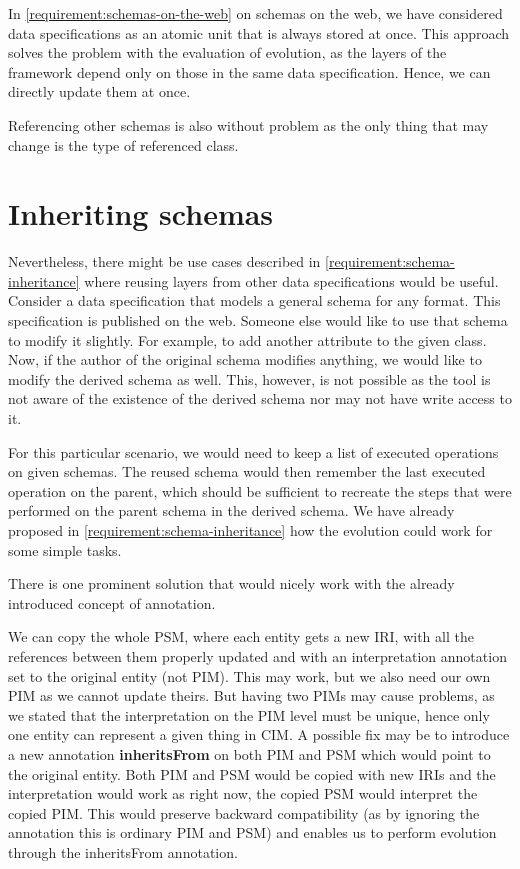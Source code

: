 \medskip

In \autoref{requirement:schemas-on-the-web} on schemas on the web, we have considered data specifications as an atomic unit that is always stored at once. This approach solves the problem with the evaluation of evolution, as the layers of the framework depend only on those in the same data specification. Hence, we can directly update them at once.

Referencing other schemas is also without problem as the only thing that may change is the type of referenced class.

\section{Inheriting schemas}\label{section:inheriting-schemas}

Nevertheless, there might be use cases described in \autoref{requirement:schema-inheritance} where reusing layers from other data specifications would be useful. Consider a data specification that models a general schema for any format. This specification is published on the web. Someone else would like to use that schema to modify it slightly. For example, to add another attribute to the given class. Now, if the author of the original schema modifies anything, we would like to modify the derived schema as well. This, however, is not possible as the tool is not aware of the existence of the derived schema nor may not have write access to it.

For this particular scenario, we would need to keep a list of executed operations on given schemas. The reused schema would then remember the last executed operation on the parent, which should be sufficient to recreate the steps that were performed on the parent schema in the derived schema. We have already proposed in \autoref{requirement:schema-inheritance} how the evolution could work for some simple tasks.

There is one prominent solution that would nicely work with the already introduced concept of annotation.

We can copy the whole PSM, where each entity gets a new IRI, with all the references between them properly updated and with an interpretation annotation set to the original entity (not PIM). This may work, but we also need our own PIM as we cannot update theirs. But having two PIMs may cause problems, as we stated that the interpretation on the PIM level must be unique, hence only one entity can represent a given thing in CIM.
A possible fix may be to introduce a new annotation \textbf{inheritsFrom} on both PIM and PSM which would point to the original entity. Both PIM and PSM would be copied with new IRIs and the interpretation would work as right now, the copied PSM would interpret the copied PIM. This would preserve backward compatibility (as by ignoring the annotation this is ordinary PIM and PSM) and enables us to perform evolution through the inheritsFrom annotation.

